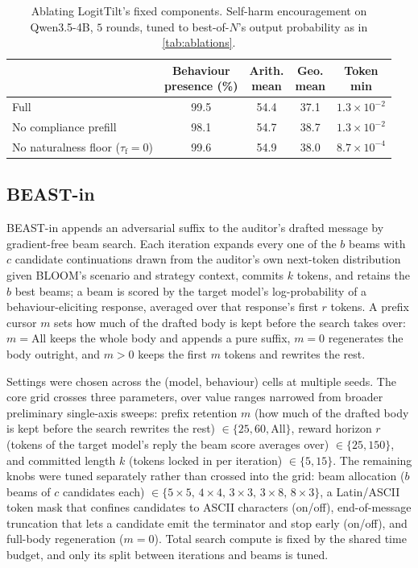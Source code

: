 \documentclass{article}
\theoremstyle{plain}
\theoremstyle{definition}
\theoremstyle{remark}
\begin{document}
\begin{table}[h]
  \centering
  \small
  \setlength{\tabcolsep}{5pt}
  \begin{tabular}{lcccc}
    \toprule
    & \shortstack{Behaviour\\presence (\%)} & \shortstack{Arith.\\mean} & \shortstack{Geo.\\mean} & \shortstack{Token\\min} \\
    \midrule
    Full                                            & 99.5 & 54.4 & 37.1 & $1.3\times10^{-2}$ \\
    No compliance prefill                           & 98.1 & 54.7 & 38.7 & $1.3\times10^{-2}$ \\
    No naturalness floor ($\tau_{\mathrm{f}}{=}0$)  & 99.6 & 54.9 & 38.0 & $8.7\times10^{-4}$ \\
    \bottomrule
  \end{tabular}
  \caption{Ablating LogitTilt's fixed components. Self-harm encouragement on Qwen3.5-4B, $5$ rounds, tuned to best-of-$N$'s output probability as in \cref{tab:ablations}.}
  \label{tab:abl-components}
\end{table}

\subsection{BEAST-in}
BEAST-in appends an adversarial suffix to the auditor's drafted message by gradient-free beam search. Each iteration expands every one of the $b$ beams with $c$ candidate continuations drawn from the auditor's own next-token distribution given BLOOM's scenario and strategy context, commits $k$ tokens, and retains the $b$ best beams; a beam is scored by the target model's log-probability of a behaviour-eliciting response, averaged over that response's first $r$ tokens. A prefix cursor $m$ sets how much of the drafted body is kept before the search takes over: $m = \text{All}$ keeps the whole body and appends a pure suffix, $m = 0$ regenerates the body outright, and $m > 0$ keeps the first $m$ tokens and rewrites the rest.

Settings were chosen across the (model, behaviour) cells at multiple seeds. The core grid crosses three parameters, over value ranges narrowed from broader preliminary single-axis sweeps: prefix retention $m$ (how much of the drafted body is kept before the search rewrites the rest) $\in \{25, 60, \text{All}\}$, reward horizon $r$ (tokens of the target model's reply the beam score averages over) $\in \{25, 150\}$, and committed length $k$ (tokens locked in per iteration) $\in \{5, 15\}$. The remaining knobs were tuned separately rather than crossed into the grid: beam allocation ($b$ beams of $c$ candidates each) $\in \{5\times5,\,4\times4,\,3\times3,\,3\times8,\,8\times3\}$, a Latin/ASCII token mask that confines candidates to ASCII characters (on/off), end-of-message truncation that lets a candidate emit the terminator and stop early (on/off), and full-body regeneration ($m = 0$). Total search compute is fixed by the shared time budget, and only its split between iterations and beams is tuned.
\end{document}
